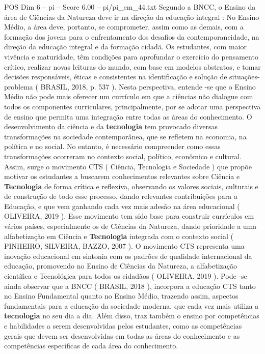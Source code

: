 \begin{textsample}{POS Dim 6 – pi – Score 6.00 – pi/pi\_em\_44.txt}
Segundo a BNCC, o Ensino da área de Ciências da Natureza deve ir na direção da educação integral : No Ensino Médio, a área deve, portanto, se comprometer, assim como as demais, com a formação dos jovens para o enfrentamento dos desafios da contemporaneidade, na direção da educação integral e da formação cidadã.
Os estudantes, com maior vivência e maturidade, têm condições para aprofundar o exercício do pensamento crítico, realizar novas leituras do mundo, com base em modelos abstratos, e tomar decisões responsáveis, éticas e consistentes na identificação e solução de situações-problema ( BRASIL, 2018, p. 537 ).
Nesta perspectiva, entende -se que o Ensino Médio não pode mais oferecer um currículo em que a ciências não dialogue com todos os componentes curriculares, principalmente, por se adotar uma perspectiva de ensino que permita uma integração entre todas as áreas do conhecimento.
O desenvolvimento da ciência e da \textbf{tecnologia} tem provocado diversas transformações na sociedade contemporânea, que se refletem na economia, na política e no social.
No entanto, é necessário compreender como essas transformações ocorreram no contexto social, político, econômico e cultural.
Assim, surge o movimento CTS ( Ciência, Tecnologia e Sociedade ) que propõe motivar os estudantes a buscarem conhecimentos relevantes sobre Ciência e \textbf{Tecnologia} de forma crítica e reflexiva, observando os valores sociais, culturais e de construção de todo esse processo, dando relevantes contribuições para a Educação, e que vem ganhando cada vez mais adesão na área educacional ( OLIVEIRA, 2019 ).
Esse movimento tem sido base para construir currículos em vários países, especialmente os de Ciências da Natureza, dando prioridade a uma alfabetização em Ciência e \textbf{Tecnologia} integrada com o contexto social ( PINHEIRO, SILVEIRA, BAZZO, 2007 ).
O movimento CTS representa uma inovação educacional em sintonia com os padrões de qualidade internacional da educação, promovendo no Ensino de Ciências da Natureza, a alfabetização científica e Tecnológica para todos os cidadãos ( OLIVEIRA, 2019 ).
Pode -se ainda observar que a BNCC ( BRASIL, 2018 ), incorpora a educação CTS tanto no Ensino Fundamental quanto no Ensino Médio, trazendo assim, aspectos fundamentais para a educação da sociedade moderna, que cada vez mais utiliza a \textbf{tecnologia} no seu dia a dia.
Além disso, traz também o ensino por competências e habilidades a serem desenvolvidas pelos estudantes, como as competências gerais que devem ser desenvolvidas em todas as áreas do conhecimento e as competências específicas de cada área do conhecimento.

\end{textsample}
